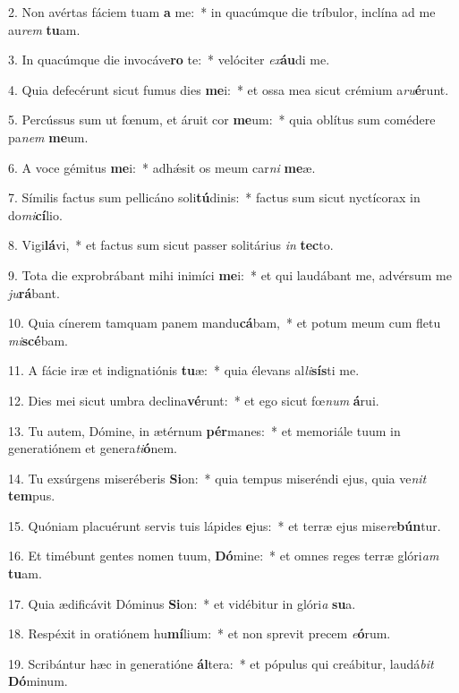 2. Non avértas fáciem tuam \textbf{a} me:~*  in quacúmque die tríbulor, inclína ad me au\textit{rem} \textbf{tu}am.\

3. In quacúmque die invocáve\textbf{ro} te:~*  velóciter \textit{ex}\textbf{áu}di me.\

4. Quia defecérunt sicut fumus dies \textbf{me}i:~*  et ossa mea sicut crémium a\textit{ru}\textbf{é}runt.\

5. Percússus sum ut fœnum, et áruit cor \textbf{me}um:~*  quia oblítus sum comédere pa\textit{nem} \textbf{me}um.\

6. A voce gémitus \textbf{me}i:~*  adhǽsit os meum car\textit{ni} \textbf{me}æ.\

7. Símilis factus sum pellicáno soli\textbf{tú}dinis:~*  factus sum sicut nyctícorax in do\textit{mi}\textbf{cí}lio.\

8. Vigi\textbf{lá}vi,~*  et factus sum sicut passer solitárius \textit{in} \textbf{tec}to.\

9. Tota die exprobrábant mihi inimíci \textbf{me}i:~*  et qui laudábant me, advérsum me \textit{ju}\textbf{rá}bant.\

10. Quia cínerem tamquam panem mandu\textbf{cá}bam,~*  et potum meum cum fletu \textit{mi}\textbf{scé}bam.\

11. A fácie iræ et indignatiónis \textbf{tu}æ:~*  quia élevans al\textit{li}\textbf{sís}ti me.\

12. Dies mei sicut umbra declina\textbf{vé}runt:~*  et ego sicut fœ\textit{num} \textbf{á}rui.\

13. Tu autem, Dómine, in ætérnum \textbf{pér}manes:~*  et memoriále tuum in generatiónem et genera\textit{ti}\textbf{ó}nem.\

14. Tu exsúrgens miseréberis \textbf{Si}on:~*  quia tempus miseréndi ejus, quia ve\textit{nit} \textbf{tem}pus.\

15. Quóniam placuérunt servis tuis lápides \textbf{e}jus:~*  et terræ ejus mise\textit{re}\textbf{bún}tur.\

16. Et timébunt gentes nomen tuum, \textbf{Dó}mine:~*  et omnes reges terræ glóri\textit{am} \textbf{tu}am.\

17. Quia ædificávit Dóminus \textbf{Si}on:~*  et vidébitur in glóri\textit{a} \textbf{su}a.\

18. Respéxit in oratiónem hu\textbf{mí}lium:~*  et non sprevit precem \textit{e}\textbf{ó}rum.\

19. Scribántur hæc in generatióne \textbf{ál}tera:~*  et pópulus qui creábitur, laudá\textit{bit} \textbf{Dó}minum.\

